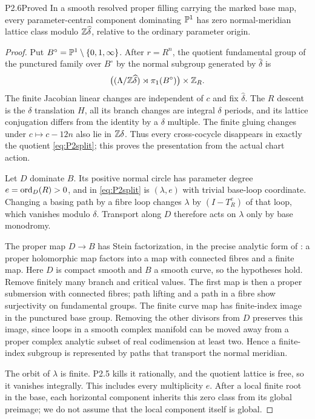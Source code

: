 \begin{statement}{P2.6}{Proved}
In a smooth resolved proper filling carrying the marked base map, every parameter-central component dominating $\mathbb P^1$ has zero normal-meridian lattice class modulo $\mathbb Z\widehat\delta$, relative to the ordinary parameter origin.
\end{statement}
\begin{proof}
Put $B^\circ=\mathbb P^1\setminus\{0,1,\infty\}$. After $r=R^n$, the quotient fundamental group of the punctured family over $B^\circ$ by the normal subgroup generated by $\widehat\delta$ is
\begin{equation}\label{eq:P2split}
 \bigl((\Lambda/\mathbb Z\widehat\delta)\rtimes\pi_1(B^\circ)\bigr)\times\mathbb Z_R.
\end{equation}
The finite Jacobian linear changes are independent of $c$ and fix $\widehat\delta$. The $R$ descent is the $\delta$ translation $H$, all its branch changes are integral $\delta$ periods, and its lattice conjugation differs from the identity by a $\delta$ multiple. The finite gluing changes under $c\mapsto c-12n$ also lie in $\mathbb Z\delta$. Thus every cross-cocycle disappears in exactly the quotient \eqref{eq:P2split}; this proves the presentation from the actual chart action.

Let $D$ dominate $B$. Its positive normal circle has parameter degree $e=\operatorname{ord}_D(R)>0$, and in \eqref{eq:P2split} is $(\lambda,e)$ with trivial base-loop coordinate. Changing a basing path by a fibre loop changes $\lambda$ by $(I-T_R^e)$ of that loop, which vanishes modulo $\delta$. Transport along $D$ therefore acts on $\lambda$ only by base monodromy.

The proper map $D\to B$ has Stein factorization, in the precise analytic form of \cite[Theorem 8.5]{Movasati24}: a proper holomorphic map factors into a map with connected fibres and a finite map. Here $D$ is compact smooth and $B$ a smooth curve, so the hypotheses hold. Remove finitely many branch and critical values. The first map is then a proper submersion with connected fibres; path lifting and a path in a fibre show surjectivity on fundamental groups. The finite curve map has finite-index image in the punctured base group. Removing the other divisors from $D$ preserves this image, since loops in a smooth complex manifold can be moved away from a proper complex analytic subset of real codimension at least two. Hence a finite-index subgroup is represented by paths that transport the normal meridian.

The orbit of $\lambda$ is finite. P2.5 kills it rationally, and the quotient lattice is free, so it vanishes integrally. This includes every multiplicity $e$. After a local finite root in the base, each horizontal component inherits this zero class from its global preimage; we do not assume that the local component itself is global.
\end{proof}

